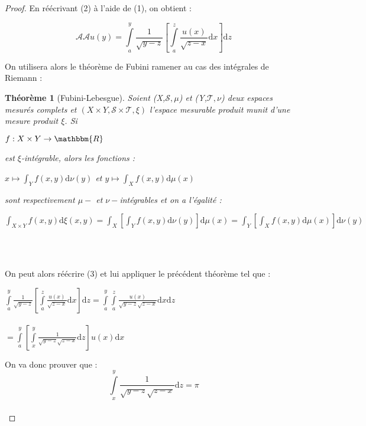 \documentclass[french]{article}
\begin{document}
\begin{proof}
En réécrivant (2) à l'aide de (1), on obtient :
\begin{center}
    \begin{equation}
        \mathcal{A}\mathcal{A}u(y)=\int\limits_{a}^{y}\frac{1}{\sqrt{y-z}}[\int\limits_{a}^{z}\frac{u(x)}{\sqrt{z-x}}\mathrm{d}x]\mathrm{d}z
    \end{equation}
\end{center}
On utilisera alors le théorème de Fubini ramener au cas des intégrales de Riemann :
\newpage
\newtheorem*{thmv2}{Théorème}
\begin{thmv2}[Fubini-Lebesgue]
Soient (X,$\mathcal{S},\mu$) et (Y,$\mathcal{T},\nu$) deux espaces mesurés complets et $(X\times Y,\mathcal{S}\times\mathcal{T},\xi)$ l'espace mesurable produit munit d'une mesure produit $\xi$. Si
\begin{center}
    $f : X \times Y \to \mathbbm{R}$
\end{center}
est $\xi$-intégrable, alors les fonctions :
\begin{center}
    $x\mapsto\int_{Y}f(x,y)\mathrm{d}\nu(y)$ et $y\mapsto\int_{X}f(x,y)\mathrm{d}\mu(x)$
\end{center}
sont respectivement $\mu-$ et $\nu-$intégrables et on a l'égalité :
\begin{center}
    $\int_{X\times Y}f(x,y)\mathrm{d}\xi(x,y) = \int_{X}[\int_{Y}f(x,y)\mathrm{d}\nu(y)]\mathrm{d}\mu(x) = \int_{Y}[\int_{X}f(x,y)\mathrm{d}\mu(x)]\mathrm{d}\nu(y)$
\end{center}
\ \\
\end{thmv2}
\ \\
On peut alors réécrire (3) et lui appliquer le précédent théorème tel que :
\begin{center}
    $\int\limits_{a}^{y}\frac{1}{\sqrt{y-z}}[\int\limits_{a}^{z}\frac{u(x)}{\sqrt{z-x}}\mathrm{d}x]\mathrm{d}z=\int\limits_{a}^{y}\int\limits_{a}^{z}\frac{u(x)}{\sqrt{y-z}\sqrt{z-x}}\mathrm{d}x\mathrm{d}z$\\
    \ \\
    \hspace{4,1cm}$=\int\limits_{a}^{y}[\int\limits_{x}^{y}\frac{1}{\sqrt{y-z}\sqrt{z-x}}\mathrm{d}z]u(x)\mathrm{d}x$
\end{center}
On va donc prouver que :\begin{equation}
    \int\limits_{x}^{y}\frac{1}{\sqrt{y-z}\sqrt{z-x}}\mathrm{d}z=\pi\end{equation}\\

\end{proof}
\end{document}
